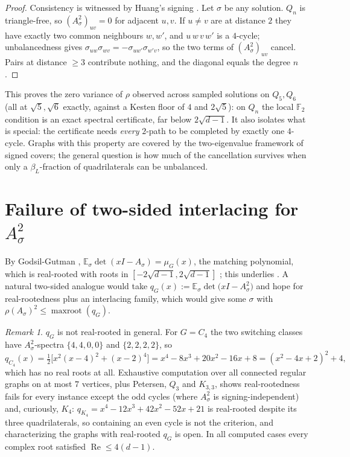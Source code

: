 \documentclass[11pt]{article}
\theoremstyle{remark}
\newtheorem{remark}[lemma]{Remark}
\newcommand{\F}{\mathbb{F}}
\newcommand{\rhomax}{\rho}
\begin{document}
\begin{proof}
Consistency is witnessed by Huang's signing \cite{huang19}. Let $\sigma$
be any solution. $Q_n$ is triangle-free, so
$(A_\sigma^2)_{uv}=0$ for adjacent $u,v$. If $u\ne v$ are at distance
$2$ they have exactly two common neighbours $w,w'$, and
$u\,w\,v\,w'$ is a $4$-cycle; unbalancedness gives
$\sigma_{uw}\sigma_{wv}=-\sigma_{uw'}\sigma_{w'v}$, so the two terms of
$(A_\sigma^2)_{uv}$ cancel. Pairs at distance $\ge3$ contribute nothing,
and the diagonal equals the degree $n$.
\end{proof}

This proves the zero variance of $\rhomax$ observed across sampled solutions on $Q_5,Q_6$ (all at $\sqrt5,\sqrt6$ exactly, against a Kesten
floor of $4$ and $2\sqrt5$): on $Q_n$ the local $\F_2$ condition is an
exact spectral certificate, far below $2\sqrt{d-1}$. It also isolates
what is special: the certificate needs \emph{every} $2$-path to be
completed by exactly one $4$-cycle. Graphs with this property are
covered by the two-eigenvalue framework of signed covers; the general
question is how much of the cancellation survives when only a
$\beta_L$-fraction of quadrilaterals can be unbalanced.


\section{Failure of two-sided interlacing for $A_\sigma^2$}

By Godsil-Gutman \cite{godsilgutman81},
$\mathbb{E}_\sigma\det(xI-A_\sigma)=\mu_G(x)$, the matching polynomial,
which is real-rooted with roots in $[-2\sqrt{d-1},2\sqrt{d-1}]$
\cite{heilmannlieb72}; this underlies \cite{mss15}. A natural two-sided
analogue would take
$q_G(x):=\mathbb{E}_\sigma\det\!\big(xI-A_\sigma^2\big)$ and hope for
real-rootedness plus an interlacing family, which would give some
$\sigma$ with $\rhomax(A_\sigma)^2\le\operatorname{maxroot}(q_G)$.

\begin{remark}\label{rem:qG}
$q_G$ is not real-rooted in general. For $G=C_4$ the two switching
classes have $A_\sigma^2$-spectra $\{4,4,0,0\}$ and $\{2,2,2,2\}$, so
\[
q_{C_4}(x)=\tfrac12\big[x^2(x-4)^2+(x-2)^4\big]
=x^4-8x^3+20x^2-16x+8=(x^2-4x+2)^2+4,
\]
which has no real roots at all. Exhaustive computation over all
connected regular graphs on at most $7$ vertices, plus Petersen, $Q_3$
and $K_{3,3}$, shows real-rootedness fails for every instance except the odd cycles
(where $A_\sigma^2$ is signing-independent) and, curiously, $K_4$:
$q_{K_4}=x^4-12x^3+42x^2-52x+21$ is real-rooted despite its three
quadrilaterals, so containing an even cycle is not the criterion, and
characterizing the graphs with real-rooted $q_G$ is open. In all
computed cases every complex root satisfied
$\operatorname{Re}\le4(d-1)$.
\end{remark}
\end{document}

